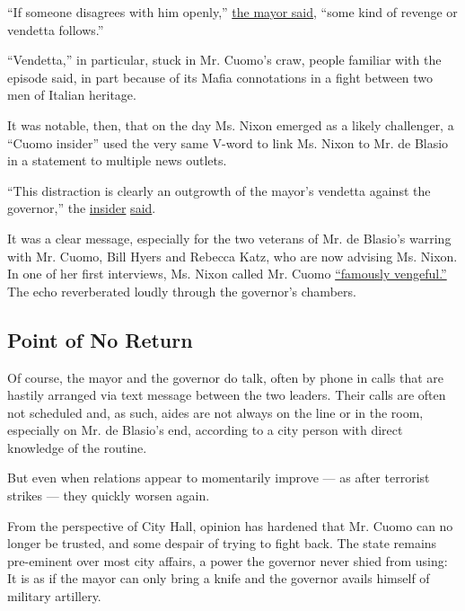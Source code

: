 ``If someone disagrees with him openly,''
\href{https://www.nytimes3xbfgragh.onion/2015/07/01/nyregion/de-blasio-denounces-cuomo-accusing-him-of-hurting-new-york-city.html}{the
mayor said}, ``some kind of revenge or vendetta follows.''

``Vendetta,'' in particular, stuck in Mr. Cuomo's craw, people familiar
with the episode said, in part because of its Mafia connotations in a
fight between two men of Italian heritage.

It was notable, then, that on the day Ms. Nixon emerged as a likely
challenger, a ``Cuomo insider'' used the very same V-word to link Ms.
Nixon to Mr. de Blasio in a statement to multiple news outlets.

``This distraction is clearly an outgrowth of the mayor's vendetta
against the governor,'' the
\href{https://nypost.com/2018/03/06/cynthia-nixon-is-quietly-working-on-her-run-against-cuomo/}{insider}
\href{http://www.nydailynews.com/new-york/cynthia-nixon-reportedly-poised-announce-run-cuomo-article-1.3858946}{said}.

It was a clear message, especially for the two veterans of Mr. de
Blasio's warring with Mr. Cuomo, Bill Hyers and Rebecca Katz, who are
now advising Ms. Nixon. In one of her first interviews, Ms. Nixon called
Mr. Cuomo
\href{https://www.glamour.com/story/cynthia-nixon-new-york-governor-interview}{``famously
vengeful.''} The echo reverberated loudly through the governor's
chambers.

\hypertarget{point-of-no-return}{%
\subsection{Point of No Return}\label{point-of-no-return}}

Of course, the mayor and the governor do talk, often by phone in calls
that are hastily arranged via text message between the two leaders.
Their calls are often not scheduled and, as such, aides are not always
on the line or in the room, especially on Mr. de Blasio's end, according
to a city person with direct knowledge of the routine.

But even when relations appear to momentarily improve --- as after
terrorist strikes --- they quickly worsen again.

From the perspective of City Hall, opinion has hardened that Mr. Cuomo
can no longer be trusted, and some despair of trying to fight back. The
state remains pre-eminent over most city affairs, a power the governor
never shied from using: It is as if the mayor can only bring a knife and
the governor avails himself of military artillery.

